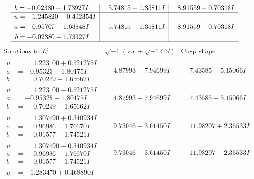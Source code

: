 \documentclass[1p]{elsarticle_modified}
\theoremstyle{definition}
\newcommand{\I}{\sqrt{-1}}
\begin{document}
$$\begin{array}{c|c|c}
\begin{aligned}
b &= -0.02380 - 1.73927 I\end{aligned}
 & \phantom{-}5.74815 - 1.35811 I & \phantom{-}8.91559 + 0.70318 I \\ \hline\begin{aligned}
u &= -1.245820 - 0.402354 I \\
a &= \phantom{-}0.95707 + 1.63848 I \\
b &= -0.02380 + 1.73927 I\end{aligned}
 & \phantom{-}5.74815 + 1.35811 I & \phantom{-}8.91559 - 0.70318 I\\
 \hline 
 \end{array}$$\newpage$$\begin{array}{c|c|c}  
\text{Solutions to }I^u_{2}& \I (\text{vol} + \sqrt{-1}CS) & \text{Cusp shape}\\
 \hline 
\begin{aligned}
u &= \phantom{-}1.223100 + 0.521275 I \\
a &= -0.95325 - 1.80175 I \\
b &= \phantom{-}0.70249 - 1.65662 I\end{aligned}
 & \phantom{-}4.87993 + 7.94699 I & \phantom{-}7.43585 - 5.15066 I \\ \hline\begin{aligned}
u &= \phantom{-}1.223100 - 0.521275 I \\
a &= -0.95325 + 1.80175 I \\
b &= \phantom{-}0.70249 + 1.65662 I\end{aligned}
 & \phantom{-}4.87993 - 7.94699 I & \phantom{-}7.43585 + 5.15066 I \\ \hline\begin{aligned}
u &= \phantom{-}1.307490 + 0.340934 I \\
a &= \phantom{-}0.96986 + 1.76670 I \\
b &= \phantom{-}0.01577 + 1.74521 I\end{aligned}
 & \phantom{-}9.73046 - 3.61450 I & \phantom{-}11.98207 + 2.36533 I \\ \hline\begin{aligned}
u &= \phantom{-}1.307490 - 0.340934 I \\
a &= \phantom{-}0.96986 - 1.76670 I \\
b &= \phantom{-}0.01577 - 1.74521 I\end{aligned}
 & \phantom{-}9.73046 + 3.61450 I & \phantom{-}11.98207 - 2.36533 I \\ \hline\begin{aligned}
u &= -1.283470 + 0.468890 I \\

\end{aligned}
\end{array}$$
\end{document}
